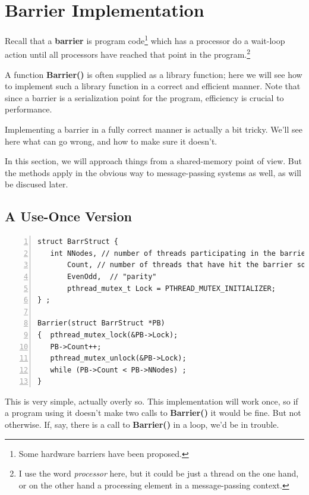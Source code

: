 \section{Barrier Implementation}

Recall that a \textbf{barrier} is program code\footnote{Some hardware
barriers have been proposed.} which has a processor do a wait-loop
action until all processors have reached that point in the
program.\footnote{I use the word {\it processor} here, but it could be
just a thread on the one hand, or on the other hand a processing element
in a message-passing context.}

A function {\bf Barrier()} is often supplied as a library function; here
we will see how to implement such a library function in a correct and
efficient manner.  Note that since a barrier is a serialization point
for the program, efficiency is crucial to performance.

Implementing a barrier in a fully correct manner is actually a bit
tricky.  We'll see here what can go wrong, and how to make sure it
doesn't.

In this section, we will approach things from a shared-memory point of
view.  But the methods apply in the obvious way to message-passing
systems as well, as will be discused later.

\subsection{A Use-Once Version}

\begin{samepage}
\begin{Verbatim}[fontsize=\relsize{-2},numbers=left]
struct BarrStruct {
   int NNodes, // number of threads participating in the barrier
       Count, // number of threads that have hit the barrier so far
       EvenOdd,  // "parity"
       pthread_mutex_t Lock = PTHREAD_MUTEX_INITIALIZER;
} ;

Barrier(struct BarrStruct *PB)
{  pthread_mutex_lock(&PB->Lock);
   PB->Count++;
   pthread_mutex_unlock(&PB->Lock);
   while (PB->Count < PB->NNodes) ;
}
\end{Verbatim}
\end{samepage}

This is very simple, actually overly so. This implementation will work
once, so if a program using it doesn't make two calls to {\bf Barrier()}
it would be fine.  But not otherwise.  If, say, there is a call to {\bf
Barrier()} in a loop, we'd be in trouble.

